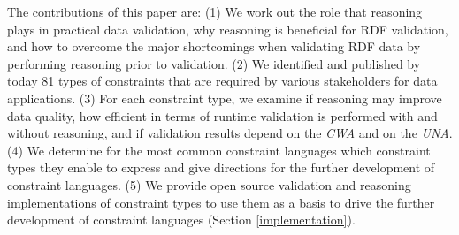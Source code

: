 \documentclass{acm_proc_article-sp}
\newcommand{\tb}[1]{\todo[size=\small, color=green!40]{\textbf{Thomas:} #1}}
\begin{document}
The contributions of this paper are:
(1) We work out the role that reasoning plays in practical data validation,
why reasoning is beneficial for RDF validation, and 
how to overcome the major shortcomings when validating RDF data by performing reasoning prior to validation. 
(2) We identified and published by today 81 types of constraints that are required by various stakeholders for data applications. 
(3) For each constraint type, we examine
    if reasoning may improve data quality, 
    how efficient in terms of runtime validation is performed with and without reasoning, and
		if validation results depend on the \emph{CWA} and on the \emph{UNA}.
(4) We determine for the most common constraint languages which constraint types they enable to express
    and give directions for the further development of constraint languages.
(5) We provide open source validation and reasoning implementations of constraint types to use them as a basis to drive the further development of constraint languages (Section \ref{implementation}).
	


\end{document}
